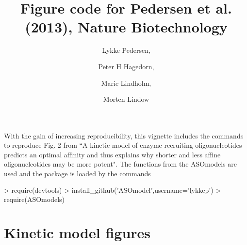\documentclass{article}
\title{Figure code for Pedersen et al. (2013), Nature Biotechnology}
\author{Lykke Pedersen, \and Peter H Hagedorn, \and Marie Lindholm, \and Morten Lindow}
\date{}
\begin{document}



\maketitle
With the gain of increasing reproducibility, this vignette includes the commands to reproduce Fig. 2 from ``A kinetic model of enzyme recruiting oligonucleotides predicts an optimal affinity and thus explains why shorter and less affine oligonucleotides may be more potent". The functions from the ASOmodels are used and the package is loaded by the commands

\begin{Schunk}
\begin{Sinput}
> require(devtools)
> install_github('ASOmodel',username='lykkep')
> require(ASOmodels)
\end{Sinput}
\end{Schunk}

\section*{Kinetic model figures}
\end{document}
